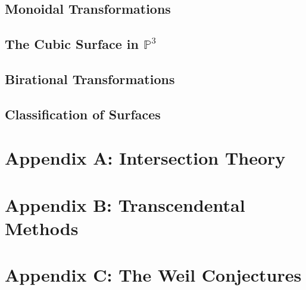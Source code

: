\documentclass[11pt, a4paper]{article}
\begin{document}
\subsection{Monoidal Transformations}

\subsection{The Cubic Surface in $\mathbb{P}^3$}

\subsection{Birational Transformations}

\subsection{Classification of Surfaces}

\section*{Appendix A: Intersection Theory}

\section*{Appendix B: Transcendental Methods}

\section*{Appendix C: The Weil Conjectures}

\end{document}
